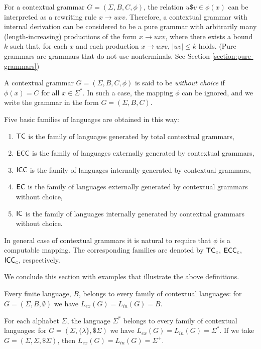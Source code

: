 For a contextual grammar $G = (\Sigma, B, C, \phi)$, the relation $u \$ v \in \phi(x)$ can be interpreted as a rewriting rule $x \to u x v$. Therefore, a contextual grammar with internal derivation can be considered to be a pure grammar with arbitrarily many (length-increasing) productions of the form $x \to u x v$, where there exists a bound $k$ such that, for each $x$ and each production $x \to u x v$, $|uv| \le k$ holds. (Pure grammars are grammars that do not use nonterminals. See Section \ref{section:pure-grammars})

A contextual grammar $G = (\Sigma, B, C, \phi)$ is said to be \emph{without choice} if $\phi(x) = C$ for all $x \in \Sigma^*$. In such a case, the mapping $\phi$ can be ignored, and we write the grammar in the form $G = (\Sigma, B, C)$.

Five basic families of languages are obtained in this way:

\begin{enumerate}
\item \index{$\TC$}$\TC$ is the family of languages generated by total contextual grammars,
\item \index{$\ECC$}$\ECC$ is the family of languages externally generated by contextual grammars,
\item \index{$\ICC$}$\ICC$ is the family of languages internally generated by contextual grammars,
\item \index{$\EC$}$\EC$ is the family of languages externally generated by contextual grammars without choice,
\item \index{$\IC$}$\IC$ is the family of languages internally generated by contextual grammars without choice.
\end{enumerate}

In general case of contextual grammars it is natural to require that $\phi$ is a computable mapping. The corresponding families are denoted by $\textup{\sf TC}_c$, $\textup{\sf ECC}_c$, $\textup{\sf ICC}_c$, respectively.

We conclude this section with examples that illustrate the above definitions.

\begin{example}
Every finite language, $B$, belongs to every family of contextual languages: for $G = (\Sigma, B, \emptyset)$ we have $L_{ex}(G) = L_{in}(G) = B$.
\end{example}

\begin{example}
For each alphabet $\Sigma$, the language $\Sigma^*$ belongs to every family of contextual languages: for $G = (\Sigma, \{\lambda\}, \$ \Sigma)$ we have $L_{ex}(G) = L_{in}(G) = \Sigma^*$. If we take $G = (\Sigma, \Sigma, \$ \Sigma)$, then $L_{ex}(G) = L_{in}(G) = \Sigma^+$.
\end{example}

